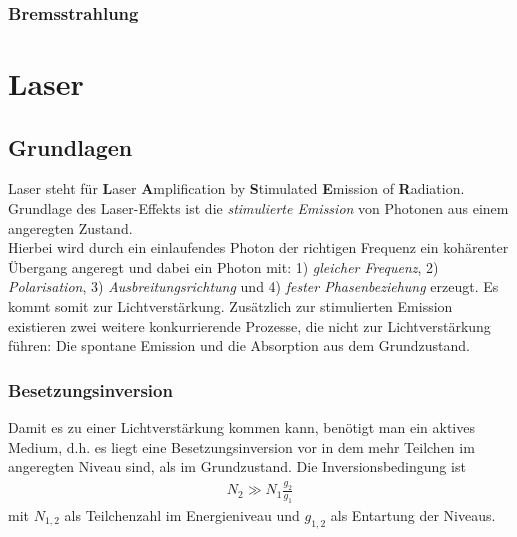 \documentclass[twocolumn]{summery_4.1}
\begin{document}
\subsubsection{Bremsstrahlung}


\section{Laser}
\subsection{Grundlagen}
Laser steht für {\bf \large L}aser {\bf\large A}mplification by {\bf\large S}timulated {\bf\large E}mission of {\bf\large R}adiation.\\[1ex]
Grundlage des Laser-Effekts ist die \emph{stimulierte Emission} von Photonen aus einem angeregten Zustand. \\
Hierbei wird durch ein einlaufendes Photon der richtigen Frequenz ein kohärenter Übergang angeregt und dabei ein Photon mit: 
1) \emph{gleicher Frequenz}, 2) \emph{Polarisation}, 3) \emph{Ausbreitungsrichtung} und 4)
\emph{fester Phasenbeziehung} erzeugt. Es kommt somit zur Lichtverstärkung.
Zusätzlich zur stimulierten Emission existieren zwei weitere konkurrierende Prozesse, die nicht zur Lichtverstärkung führen: Die spontane Emission und die Absorption aus dem Grundzustand.\\[1ex]

\subsubsection{Besetzungsinversion}
Damit es zu einer Lichtverstärkung kommen kann, benötigt man ein aktives Medium, d.h. es liegt eine Besetzungsinversion vor in dem mehr Teilchen im angeregten Niveau sind, als im Grundzustand. Die Inversionsbedingung ist 
\begin{align*}
    N_2 \gg N_1 \frac{g_2}{g_1}
\end{align*}
mit \(N_{1,2}\) als Teilchenzahl im Energieniveau und \(g_{1,2}\) als Entartung der Niveaus.
\end{document}
